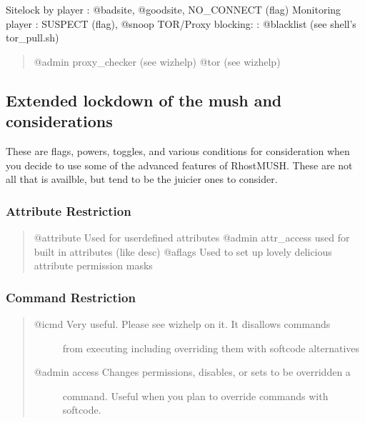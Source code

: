 \documentclass[letterpaper,10pt,english]{sphinxmanual}
\begin{document}
\sphinxAtStartPar
Sitelock by player      : @badsite, @goodsite, NO\_CONNECT (flag)
Monitoring player       : SUSPECT (flag), @snoop
TOR/Proxy blocking:     : @blacklist (see shell’s tor\_pull.sh)
\begin{quote}

\sphinxAtStartPar
@admin proxy\_checker (see wizhelp)
@tor (see wizhelp)
\end{quote}


\subsection{Extended lockdown of the mush and considerations}
\label{\detokenize{security:extended-lockdown-of-the-mush-and-considerations}}
\sphinxAtStartPar
These are flags, powers, toggles, and various conditions for consideration
when you decide to use some of the advanced features of RhostMUSH.
These are not all that is availble, but tend to be the juicier ones to consider.


\subsubsection{Attribute Restriction}
\label{\detokenize{security:attribute-restriction}}\begin{quote}

\sphinxAtStartPar
@attribute \textendash{} Used for user\sphinxhyphen{}defined attributes
@admin attr\_access \textendash{} used for built in attributes (like desc)
@aflags \textendash{} Used to set up lovely delicious attribute permission masks
\end{quote}


\subsubsection{Command Restriction}
\label{\detokenize{security:command-restriction}}\begin{quote}
\begin{description}
\item[{@icmd    \sphinxhyphen{} Very useful.   Please see wizhelp on it.  It disallows commands}] \leavevmode
\sphinxAtStartPar
from executing including overriding them with softcode alternatives

\item[{@admin access \sphinxhyphen{} Changes permissions, disables, or sets to be overridden a}] \leavevmode
\sphinxAtStartPar
command.  Useful when you plan to override commands with softcode.

\end{description}
\end{quote}
\end{document}
